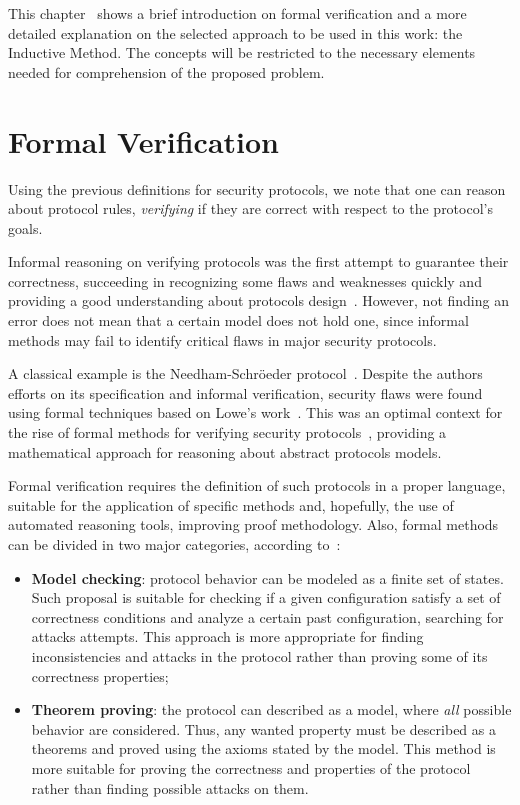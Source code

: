 This chapter~\label{chap:inductive} shows a brief introduction on formal verification and a more detailed explanation on the selected approach to be used in this work: the Inductive Method. The concepts will be restricted to the necessary elements needed for comprehension of the proposed problem.





\section{Formal Verification}
Using the previous definitions for security protocols, we note that one can reason about protocol rules, \textit{verifying} if they are correct with respect to the protocol's goals.

Informal reasoning on verifying protocols was the first attempt to guarantee their correctness, succeeding in recognizing some flaws and weaknesses quickly and providing a good understanding about protocols design~\cite{Bella2007}. However, not finding an error does not mean that a certain model does not hold one, since informal methods may fail to identify critical flaws in major security protocols.

A classical example is the Needham-Schröeder protocol~\cite{NeedhamSchroeder78}. Despite the authors efforts on its specification and informal verification, security flaws were found using formal techniques based on Lowe's work~\cite{Lowe96}. This was an optimal context for the rise of formal methods for verifying security protocols~\cite{Meadows96, Meadows94, Kemmerer94, Burrows90}, providing a mathematical approach for reasoning about abstract protocols models.

Formal verification requires the definition of such protocols in a proper language, suitable for the application of specific methods and, hopefully, the use of automated reasoning tools, improving proof methodology. Also, formal methods can be divided in two major categories, according to~\cite{BoydMathuria2008}:

\begin{itemize}
  \item \textbf{Model checking}: protocol behavior can be modeled as a finite set of states. Such proposal is suitable for checking if a given configuration satisfy a set of correctness conditions and analyze a certain past configuration, searching for attacks attempts. This approach is more appropriate for finding inconsistencies and attacks in the protocol rather than proving some of its correctness properties;

  \item \textbf{Theorem proving}: the protocol can described as a model, where \textit{all} possible behavior are considered. Thus, any wanted property must be described as a theorems and proved using the axioms stated by the model. This method is more suitable for proving the correctness and properties of the protocol rather than finding possible attacks on them.
\end{itemize}



